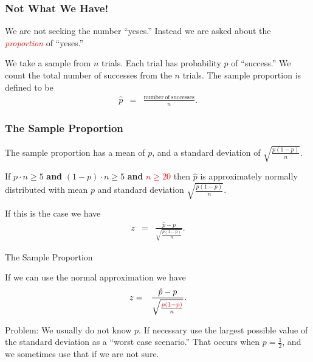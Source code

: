 \begin{frame}
  \frametitle{Not What We Have!}

  We are not seeking the number ``yeses.''  Instead we are asked about
  the \textcolor{red}{\textit{proportion}} of ``yeses.''

  \vfill

  \begin{definition}[\textcolor{red}{The sample proportion}]

    We take a sample from $n$ trials. Each trial has probability $p$
    of ``success.'' We count the total number of successes from the
    $n$ trials.  The sample proportion is defined to be
    \begin{eqnarray*}
      \hat{p} & = & \frac{\mathrm{number~of~successes}}{n}.
    \end{eqnarray*}
    
  \end{definition}



\end{frame}

\begin{frame}
  \frametitle{The Sample Proportion}

  The sample proportion has a mean of $p$, and a standard deviation of
  $\sqrt{\frac{p(1-p)}{n}}$.

  \vfill

  {

    If $p\cdot n \geq 5$ \textbf{and} $(1-p)\cdot n \geq 5$
    \textbf{and} \textcolor{red}{$n\geq 20$} then $\hat{p}$ is
    approximately normally distributed with mean $p$ and standard
    deviation $\sqrt{\frac{p(1-p)}{n}}$.

  }

  \vfill

  {
    If this is the case we have
    \begin{eqnarray*}
      z & = & \frac{\hat{p}-p}{\sqrt{\frac{p(1-p)}{n}}}.
    \end{eqnarray*}
  }

  \vfill

\end{frame}


\begin{frame}{The Sample Proportion}

  If we can use the normal approximation we have
  \begin{eqnarray*}
    z & = & \frac{\hat{p}-p}{\sqrt{\frac{\textcolor{red}{p(1-p)}}{n}}}.
  \end{eqnarray*}

  \vfill

  Problem: We usually do not know $p$. {\color{blue}If necessary use
    the largest possible value of the standard deviation as a
    ``worst case scenario.''} That occurs when $p=\frac{1}{2}$, and
    we sometimes use that if we are not sure.

    \vfill

\end{frame}

